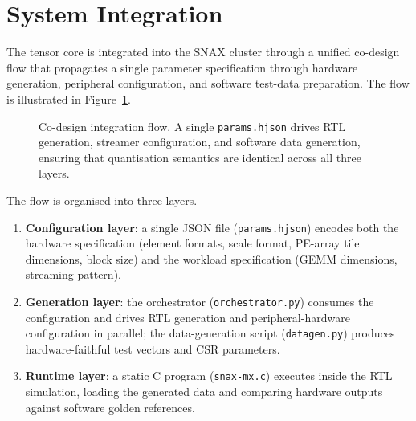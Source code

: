 
\section{System Integration}
\label{sec:integration}

The tensor core is integrated into the SNAX cluster through a unified
co-design flow that propagates a single parameter specification through
hardware generation, peripheral configuration, and software test-data
preparation.  The flow is illustrated in
Figure~\ref{fig:integration_overview}.

\begin{figure}[h]
  \centering
  \fbox{\rule{0pt}{6cm}\rule{0.85\textwidth}{0pt}}
  \caption{Co-design integration flow.  A single \texttt{params.hjson}
           drives RTL generation, streamer configuration, and software
           data generation, ensuring that quantisation semantics are
           identical across all three layers.}
  \label{fig:integration_overview}
\end{figure}

The flow is organised into three layers.
\begin{enumerate}
  \item \textbf{Configuration layer}: a single JSON file
        (\texttt{params.hjson}) encodes both the hardware specification
        (element formats, scale format, PE-array tile dimensions,
        block size) and the workload specification (GEMM dimensions,
        streaming pattern).
  \item \textbf{Generation layer}: the orchestrator
        (\texttt{orchestrator.py}) consumes the configuration and drives
        RTL generation and peripheral-hardware configuration in parallel;
        the data-generation script (\texttt{datagen.py}) produces
        hardware-faithful test vectors and CSR parameters.
  \item \textbf{Runtime layer}: a static C program
        (\texttt{snax-mx.c}) executes inside the RTL simulation,
        loading the generated data and comparing hardware outputs
        against software golden references.
\end{enumerate}

